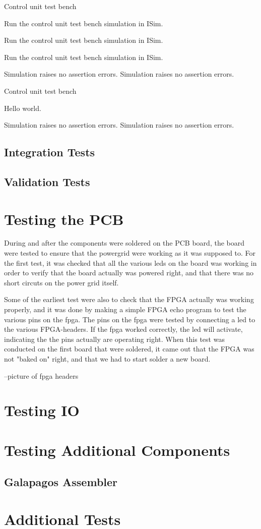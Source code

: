 \test
{Control unit test bench}{
    \item{Run the control unit test bench simulation in ISim.}
    \item{Run the control unit test bench simulation in ISim.}
    \item{Run the control unit test bench simulation in ISim.}
}{Simulation raises no assertion errors.}
{Simulation raises no assertion errors.}

\test
{Control unit test bench}
{
\item{Hello world.}
}
{Simulation raises no assertion errors.}
{Simulation raises no assertion errors.}

\subsection{Integration Tests}


\subsection{Validation Tests}

\section{Testing the PCB}
During and after the components were soldered on the PCB board, the board were tested to ensure that the powergrid were working as it was supposed to.
For the first test, it was checked that all the various leds on the board was working in order to verify that the board actually was powered right, and that there was
no short circuts on the power grid itself.

Some of the earliest test were also to check that the FPGA actually was working properly, and it was done by making a simple FPGA echo program to test the various pins on the fpga.
The pins on the fpga were tested by connecting a led to the various FPGA-headers. If the fpga worked correctly, the led will activate, indicating the the pins actually are operating right.
When this test was conducted on the first board that were soldered, it came out that the FPGA was not "baked on" right, and that we had to start solder a new board. 

--picture of fpga headers

\section{Testing IO}

\section{Testing Additional Components}

\subsection{Galapagos Assembler}


\section{Additional Tests}



